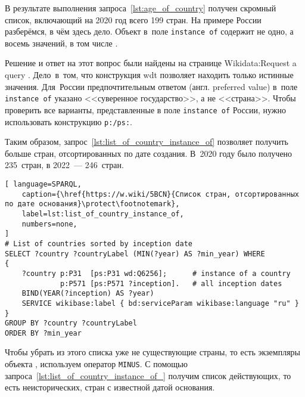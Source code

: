 В результате выполнения запроса~\ref{lst:age_of_country} 
получен скромный список, включающий на 2020 год всего 199 стран. 
На примере России разберёмся, в чём здесь дело. 
Объект  в~поле \mbox{\lstinline|instance of|} содержит не одно, а восемь значений, в том числе .

Решение и ответ на этот вопрос были найдены на странице Wikidata:Request a query%
. Дело~в~том, что конструкция wdt позволяет находить только истинные значения. 
Для~России предпочтительным ответом (англ. preferred value) 
в~поле\, \lstinline|instance of| указано <<суверенное государство>>, а не <<страна>>. 
Чтобы проверить все варианты, представленные в поле \lstinline|instance of| России, 
нужно использовать конструкцию \lstinline|p:/ps:|.

Таким образом, запрос~\ref{lst:list_of_country_instance_of} 
позволяет получить больше стран, отсортированных по дате создания. 
В~2020 году было получено 235~стран, в 2022~--- 246~стран.


\newpage
\begin{lstlisting}[ language=SPARQL, 
    caption={\href{https://w.wiki/5BCN}{Список стран, отсортированных по дате основания}\protect\footnotemark},
    label=lst:list_of_country_instance_of, 
    numbers=none,
]
# List of countries sorted by inception date
SELECT ?country ?countryLabel (MIN(?year) AS ?min_year) WHERE
{
    ?country p:P31  [ps:P31 wd:Q6256];      # instance of a country 
             p:P571 [ps:P571 ?inception].   # all inception dates
    BIND(YEAR(?inception) AS ?year)
    SERVICE wikibase:label { bd:serviceParam wikibase:language "ru" }
}
GROUP BY ?country ?countryLabel
ORDER BY ?min_year
\end{lstlisting}

Чтобы убрать из этого списка уже не существующие страны, 
то есть экземпляры объекта , 
используем оператор \lstinline|MINUS|. 
С помощью запроса~\ref{lst:list_of_country_instance_of_} получим список действующих, 
то есть неисторических, стран с известной датой основания.

